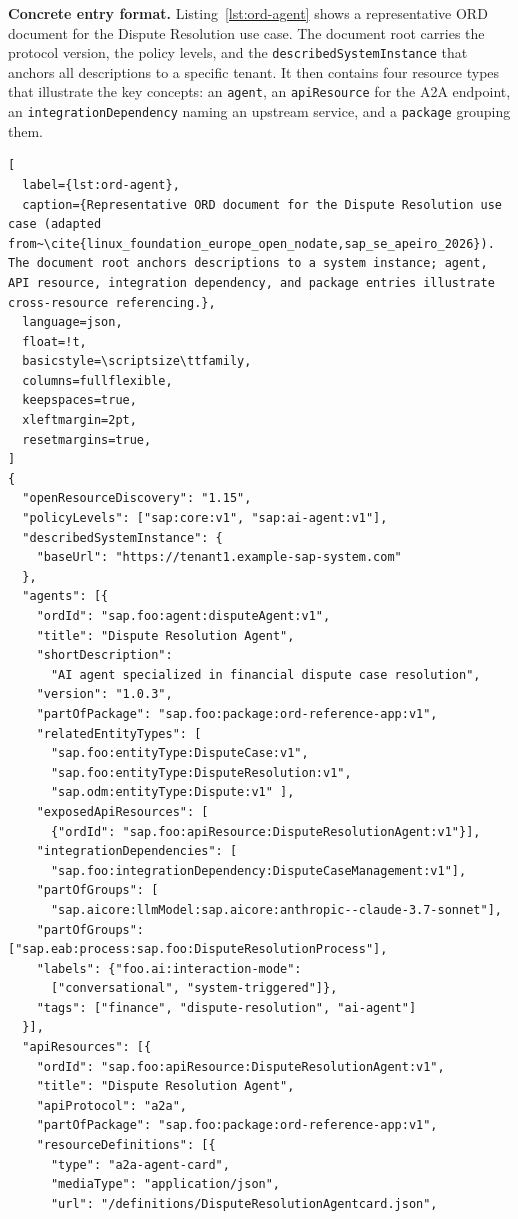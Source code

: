 \textbf{Concrete entry format.} Listing~\ref{lst:ord-agent} shows a representative ORD document for the Dispute Resolution use case. The document root carries the protocol version, the policy levels, and the \texttt{describedSystemInstance} that anchors all descriptions to a specific tenant. It then contains four resource types that illustrate the key concepts: an \texttt{agent}, an \texttt{apiResource} for the A2A endpoint, an \texttt{integrationDependency} naming an upstream service, and a \texttt{package} grouping them.

\begin{lstlisting}[
  label={lst:ord-agent},
  caption={Representative ORD document for the Dispute Resolution use case (adapted from~\cite{linux_foundation_europe_open_nodate,sap_se_apeiro_2026}). The document root anchors descriptions to a system instance; agent, API resource, integration dependency, and package entries illustrate cross-resource referencing.},
  language=json,
  float=!t,
  basicstyle=\scriptsize\ttfamily,
  columns=fullflexible,
  keepspaces=true,
  xleftmargin=2pt,
  resetmargins=true,
]
{
  "openResourceDiscovery": "1.15",
  "policyLevels": ["sap:core:v1", "sap:ai-agent:v1"],
  "describedSystemInstance": {
    "baseUrl": "https://tenant1.example-sap-system.com"
  },
  "agents": [{
    "ordId": "sap.foo:agent:disputeAgent:v1",
    "title": "Dispute Resolution Agent",
    "shortDescription":
      "AI agent specialized in financial dispute case resolution",
    "version": "1.0.3",
    "partOfPackage": "sap.foo:package:ord-reference-app:v1",
    "relatedEntityTypes": [
      "sap.foo:entityType:DisputeCase:v1",
      "sap.foo:entityType:DisputeResolution:v1",
      "sap.odm:entityType:Dispute:v1" ],
    "exposedApiResources": [
      {"ordId": "sap.foo:apiResource:DisputeResolutionAgent:v1"}],
    "integrationDependencies": [
      "sap.foo:integrationDependency:DisputeCaseManagement:v1"],
    "partOfGroups": [
      "sap.aicore:llmModel:sap.aicore:anthropic--claude-3.7-sonnet"],
    "partOfGroups": ["sap.eab:process:sap.foo:DisputeResolutionProcess"],
    "labels": {"foo.ai:interaction-mode":
      ["conversational", "system-triggered"]},
    "tags": ["finance", "dispute-resolution", "ai-agent"]
  }],
  "apiResources": [{
    "ordId": "sap.foo:apiResource:DisputeResolutionAgent:v1",
    "title": "Dispute Resolution Agent",
    "apiProtocol": "a2a",
    "partOfPackage": "sap.foo:package:ord-reference-app:v1",
    "resourceDefinitions": [{
      "type": "a2a-agent-card",
      "mediaType": "application/json",
      "url": "/definitions/DisputeResolutionAgentcard.json",

\end{lstlisting}
